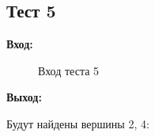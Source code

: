 \documentclass[a4paper]{article}
\begin{document}
\subsection{Тест 5}

\textbf{Вход:}
\newpage
  \begin{figure}[!h]
    \caption{Вход теста 5}
  \end{figure}
\par
\textbf{Выход:} \par
  Будут найдены вершины 2, 4:
\newpage
\end{document}
